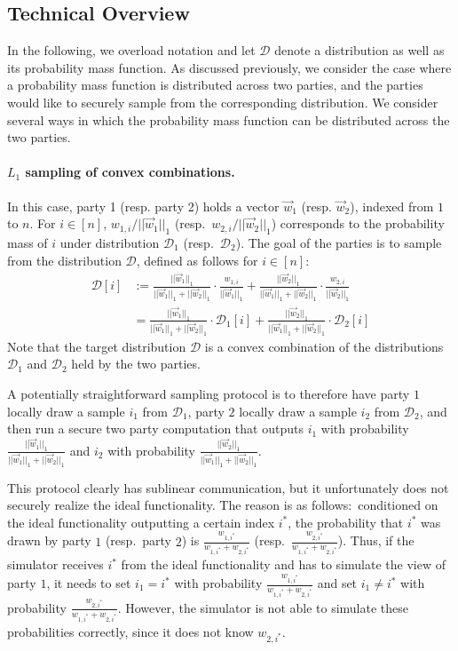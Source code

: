 \subsection{Technical Overview}

In the following, we overload notation and let $\mathcal{D}$ denote a
distribution as well as its probability mass function.  As discussed
previously, we consider the case where a probability mass function is
distributed across two parties, and the parties would like to securely
sample from the corresponding distribution.  We consider several ways in
which the probability mass function can be distributed across the two
parties.

\paragraph{$L_1$ sampling of convex combinations.}
In this case, party 1 (resp. party 2) holds a vector $\vec{w}_1$ (resp.
$\vec{w}_2$), indexed from $1$ to $n$. For $i \in [n]$,
$w_{1,i}/||\vec{w}_1||_1$ (resp.~$w_{2,i}/||\vec{w}_2||_1$) corresponds
to the probability mass of $i$ under distribution $\mathcal{D}_1$
(resp.~$\mathcal{D}_2$).  The goal of the parties is to sample from the
distribution $\mathcal{D}$, defined as follows for $i \in [n]$:
%
\begin{align*}
\mathcal{D}[i] &:= \frac{||\vec{w}_1||_1}{||\vec{w}_1||_1 + ||\vec{w}_2||_1} \cdot \frac{w_{1,i}}{||\vec{w}_1||_1} + \frac{||\vec{w}_2||_1}{||\vec{w}_1||_1 + ||\vec{w}_2||_1} \cdot \frac{w_{2,i}}{||\vec{w}_2||_1}\\
&= \frac{||\vec{w}_1||_1}{||\vec{w}_1||_1 + ||\vec{w}_2||_1} \cdot \mathcal{D}_1[i] + \frac{||\vec{w}_2||_1}{||\vec{w}_1||_1 + ||\vec{w}_2||_1} \cdot \mathcal{D}_2[i]
\end{align*}
%
Note that the target distribution $\mathcal{D}$ is a convex combination
of the distributions $\mathcal{D}_1$ and $\mathcal{D}_2$ held by the two
parties.

A potentially straightforward sampling protocol is to therefore have
party $1$ locally draw a sample $i_1$ from $\mathcal{D}_1$, party $2$
locally draw a sample $i_2$ from $\mathcal{D}_2$, and then run a secure
two party computation that outputs $i_1$ with probability
$\frac{||\vec{w}_1||_1}{||\vec{w}_1||_1 + ||\vec{w}_2||_1}$ and $i_2$
with probability $\frac{||\vec{w}_2||_1}{||\vec{w}_1||_1 +
||\vec{w}_2||_1}$.

This protocol clearly has sublinear communication, but it unfortunately does not
securely realize the ideal functionality.  The reason is as
follows:~conditioned on the ideal functionality outputting a certain
index $i^*$, the probability that $i^*$ was drawn by party $1$
(resp.~party $2$) is $\frac{w_{1,i^*}}{w_{1,i^*} + w_{2,i^*}}$
(resp.~$\frac{w_{2,i^*}}{w_{1,i^*} + w_{2,i^*}}$).  
%
Thus, if the simulator receives $i^*$ from the ideal functionality and
has to simulate the view of party $1$, it needs to set $i_1 = i^*$ with
probability $\frac{w_{1,i^*}}{w_{1,i^*} + w_{2,i^*}}$ and set $i_1 \neq
i^*$ with probability $\frac{w_{2,i^*}}{w_{1,i^*} + w_{2,i^*}}$.
However, the simulator is not able to simulate these probabilities
correctly, since it does not know $w_{2,i^*}$.

